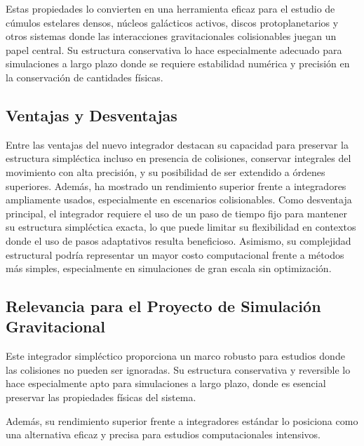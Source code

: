 Estas propiedades lo convierten en una herramienta eficaz para el estudio de cúmulos estelares densos, núcleos galácticos activos, discos protoplanetarios y otros sistemas donde las interacciones gravitacionales colisionables juegan un papel central. Su estructura conservativa lo hace especialmente adecuado para simulaciones a largo plazo donde se requiere estabilidad numérica y precisión en la conservación de cantidades físicas.

\subsection{Ventajas y Desventajas}

Entre las ventajas del nuevo integrador destacan su capacidad para preservar la estructura simpléctica incluso en presencia de colisiones, conservar integrales del movimiento con alta precisión, y su posibilidad de ser extendido a órdenes superiores. Además, ha mostrado un rendimiento superior frente a integradores ampliamente usados, especialmente en escenarios colisionables. Como desventaja principal, el integrador requiere el uso de un paso de tiempo fijo para mantener su estructura simpléctica exacta, lo que puede limitar su flexibilidad en contextos donde el uso de pasos adaptativos resulta beneficioso. Asimismo, su complejidad estructural podría representar un mayor costo computacional frente a métodos más simples, especialmente en simulaciones de gran escala sin optimización.

\subsection{Relevancia para el Proyecto de Simulación Gravitacional}

Este integrador simpléctico proporciona un marco robusto para estudios donde las colisiones no pueden ser ignoradas. Su estructura conservativa y reversible lo hace especialmente apto para simulaciones a largo plazo, donde es esencial preservar las propiedades físicas del sistema.

Además, su rendimiento superior frente a integradores estándar lo posiciona como una alternativa eficaz y precisa para estudios computacionales intensivos.
